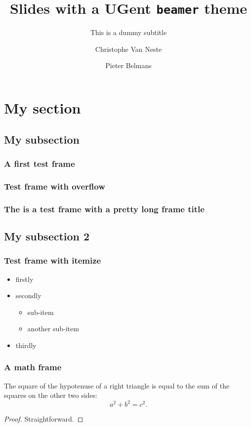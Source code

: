 \documentclass{beamer}
\title{Slides with a UGent \texttt{beamer} theme}
\subtitle{This is a dummy subtitle}
\institute[Spam]{Department of Nonsense}
\author[Van Neste \and Belmans]{Christophe Van Neste \and Pieter Belmans}
\begin{document}
\begin{frame}[t,plain]
  \titlepage
\end{frame}

\section{My section}
\subsection{My subsection}

\begin{frame}
  \frametitle{A first test frame}

  \lipsum[2]
\end{frame}

\begin{frame}
  \frametitle{Test frame with overflow}

  \lipsum[2-3]
\end{frame}

\begin{frame}
  \frametitle{The is a test frame with a pretty long frame title}

  \lipsum[2]
\end{frame}


\subsection{My subsection 2}
\begin{frame}
  \frametitle{Test frame with itemize}

  \begin{itemize}
    \item<1-> firstly
    \item<2-> secondly
      \begin{itemize}
        \item sub-item
        \item another sub-item
      \end{itemize}
    \item<3-> thirdly
  \end{itemize}
\end{frame}

\begin{frame}
  \frametitle{A math frame}
  
  \begin{theorem}[Pythagoras]
    The square of the hypotenuse of a \alert{right} triangle is equal to the sum of the squares on the other two sides:
    \[
      a^2 + b^2 = c^2.
    \]
  \end{theorem}
  \begin{proof}
    Straightforward.
  \end{proof}
\end{frame}
\end{document}
